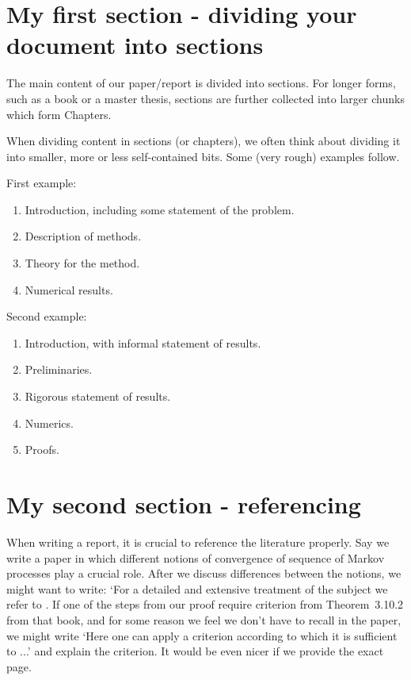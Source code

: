 \documentclass[12pt,oneside]{article}
\begin{document}
\section{My first section - dividing your document into sections}
\label{Division into sections}
The main content of our paper/report is divided into sections. 
For longer forms, such as a book or a master thesis, sections are further collected into larger chunks which form Chapters.

When dividing content in sections (or chapters), we often think about dividing it into smaller, more or less self-contained bits. Some (very rough) examples follow.

First example:
\begin{enumerate}
\item Introduction, including some statement of the problem.
\item Description of methods.
\item Theory for the method.
\item Numerical results.
\end{enumerate}

Second example:
\begin{enumerate}
\item Introduction, with informal statement of results.
\item Preliminaries.
\item Rigorous statement of results.
\item Numerics.
\item Proofs.
\end{enumerate}

\section{My second section - referencing}
\label{Referencing}
When writing a report, it is crucial to reference the literature properly. 
Say we write a paper in which different notions of convergence of sequence of Markov processes play a crucial role. 
After we discuss differences between the notions, 
we might want to write:
`For a detailed and extensive treatment of the subject we refer to \cite{ethier/kurtz:2009}.
If one of the steps from our proof require criterion from Theorem~3.10.2 from that book, and for some reason we feel we don't have to recall in the paper, we might write
`Here one can apply a criterion \cite[Theorem~3.10.2]{ethier/kurtz:2009} according to which it is sufficient to ...' and explain the criterion.
It would be even nicer if we provide the exact page.
\end{document}
